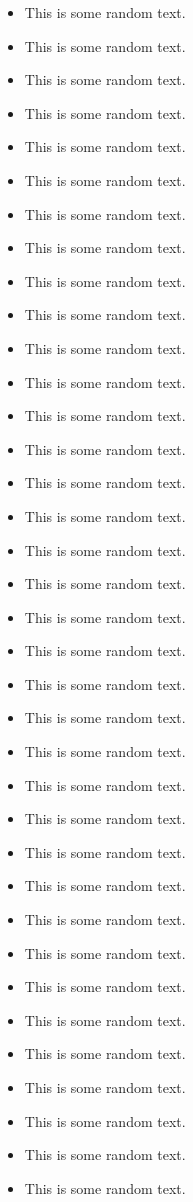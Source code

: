 \begin{itemize}
	\item This is some random text.
	\item This is some random text.
	\item This is some random text.
	\item This is some random text.
	\item This is some random text.
	\item This is some random text.
	\item This is some random text.
	\item This is some random text.
	\item This is some random text.
	\item This is some random text.
	\item This is some random text.
	\item This is some random text.
	\item This is some random text.
	\item This is some random text.
	\item This is some random text.
	\item This is some random text.
	\item This is some random text.
	\item This is some random text.
	\item This is some random text.
	\item This is some random text.
	\item This is some random text.
	\item This is some random text.
	\item This is some random text.
		\item This is some random text.
	\item This is some random text.
	\item This is some random text.
	\item This is some random text.
	\item This is some random text.
	\item This is some random text.
	\item This is some random text.
	\item This is some random text.
	\item This is some random text.
	\item This is some random text.
	\item This is some random text.
	\item This is some random text.
	\item This is some random text.

\end{itemize}
